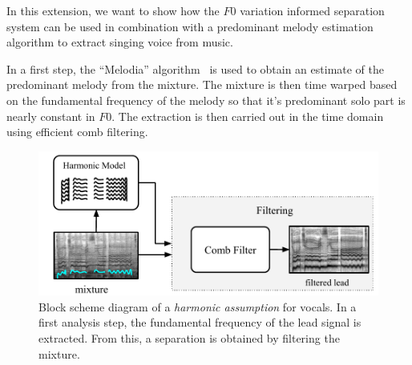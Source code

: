 
In this extension, we want to show how the \(F0\) variation informed separation system can be used in combination with a predominant melody estimation algorithm to extract singing voice from music.

\par
In a first step, the ``Melodia'' algorithm~\cite{salamon12} is used to obtain an estimate of the predominant melody from the mixture.
The mixture is then time warped based on the fundamental frequency of the melody so that it’s predominant solo part is nearly constant in \(F0\). The extraction is then carried out in the time domain using efficient comb filtering.

\begin{figure}[htbp]
    \centering
  \includegraphics[width=\columnwidth]{Chapters/05_Separation_Known/figures/comb_filter.pdf}
    \caption{Block scheme diagram of a \textit{harmonic assumption} for vocals. In a first analysis step, the fundamental frequency of the lead signal is extracted. From this, a separation is obtained by filtering the mixture.}
    \label{fig:methods_harmonicity}
\end{figure}

